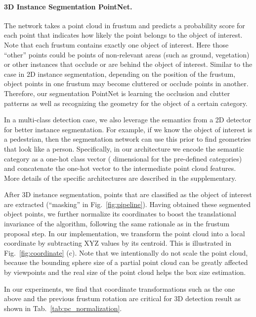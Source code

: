 \documentclass[10pt,twocolumn,letterpaper]{article}
\begin{document}
\paragraph{3D Instance Segmentation PointNet.} The network takes a point cloud in frustum and predicts a probability score for each point that indicates how likely the point belongs to the object of interest. Note that each frustum contains exactly one object of interest. Here those ``other'' points could be points of non-relevant areas (such as ground, vegetation) or other instances that occlude or are behind the object of interest. Similar to the case in 2D instance segmentation, depending on the position of the frustum, object points in one frustum may become cluttered or occlude points in another. Therefore, our segmentation PointNet is learning the occlusion and clutter patterns as well as recognizing the geometry for the object of a certain category.



In a multi-class detection case, we also leverage the semantics from a 2D detector for better instance segmentation. For example, if we know the object of interest is a pedestrian, then the segmentation network can use this prior to find geometries that look like a person. Specifically, in our architecture we encode the semantic category as a one-hot class vector ( dimensional for the pre-defined  categories) and concatenate the one-hot vector to the intermediate point cloud features. More details of the specific architectures are described in the supplementary.

After 3D instance segmentation, points that are classified as the object of interest are extracted (``masking'' in Fig.~\ref{fig:pipeline}). Having obtained these segmented object points, we further normalize its coordinates to boost the translational invariance of the algorithm, following the same rationale as in the frustum proposal step.  In our implementation, we transform the point cloud into a local coordinate by subtracting XYZ values by its centroid. This is illustrated in Fig.~\ref{fig:coordinate} (c). Note that we intentionally do not scale the point cloud, because the bounding sphere size of a partial point cloud can be greatly affected by viewpoints and the real size of the point cloud helps the box size estimation.

In our experiments, we find that coordinate transformations such as the one above and the previous frustum rotation are critical for 3D detection result as shown in Tab.~\ref{tab:pc_normalization}.  
\end{document}
